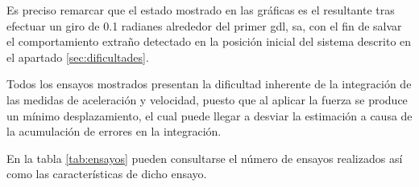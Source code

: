 Es preciso remarcar que el estado mostrado en las gráficas es el resultante tras efectuar un giro de 0.1 radianes alrededor del primer \acrshort{gdl}, \acrshort{sa}, con el fin de salvar el comportamiento extraño detectado en la posición inicial del sistema descrito en el apartado \ref{sec:dificultades}. \par 

Todos los ensayos mostrados presentan la dificultad inherente de la integración de las medidas de aceleración y velocidad, puesto que al aplicar la fuerza se produce un mínimo desplazamiento, el cual puede llegar a desviar la estimación a causa de la acumulación de errores en la integración. \par 

En la tabla \ref{tab:ensayos} pueden consultarse el número de ensayos realizados así como las características de dicho ensayo. \par 

